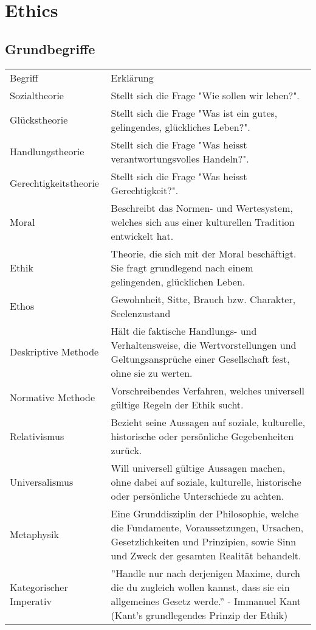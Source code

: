 \section{Ethics}
	\subsection{Grundbegriffe}
	
		\begin{longtable}{|p{}||p{}|}
			\hline
			Begriff
				& Erklärung\\
			\hhline{|=#=|}
			Sozialtheorie
				& Stellt sich die Frage "Wie sollen wir leben?".\\
			\hline
			Glückstheorie
				& Stellt sich die Frage "Was ist ein gutes, gelingendes, glückliches Leben?".\\
			\hline
			Handlungstheorie
				& Stellt sich die Frage "Was heisst verantwortungsvolles Handeln?".\\
			\hline
			Gerechtigkeitstheorie
				& Stellt sich die Frage "Was heisst Gerechtigkeit?".\\
			\hline
			Moral
				& Beschreibt das Normen- und Wertesystem, welches sich aus einer kulturellen Tradition entwickelt hat.\\
			\hline
			Ethik
				& Theorie, die sich mit der Moral beschäftigt. Sie fragt grundlegend nach einem gelingenden, glücklichen Leben.\\
			\hline
			Ethos
				& Gewohnheit, Sitte, Brauch bzw. Charakter, Seelenzustand\\
			\hline
			Deskriptive Methode
				& Hält die faktische Handlungs- und Verhaltensweise, die Wertvorstellungen und Geltungsansprüche einer Gesellschaft fest, ohne sie zu werten.\\
			\hline
			Normative Methode
				& Vorschreibendes Verfahren, welches universell gültige Regeln der Ethik sucht.\\
			\hline
			Relativismus
				& Bezieht seine Aussagen auf soziale, kulturelle, historische oder persönliche Gegebenheiten zurück.\\
			\hline
			Universalismus
				& Will universell gültige Aussagen machen, ohne dabei auf soziale, kulturelle, historische oder persönliche Unterschiede zu achten.\\
			\hline
			Metaphysik
				& Eine Grunddisziplin der Philosophie, welche die Fundamente, Voraussetzungen, Ursachen, Gesetzlichkeiten und Prinzipien, sowie Sinn und Zweck der gesamten Realität behandelt.\\
			\hline
			Kategorischer Imperativ
				& ''Handle nur nach derjenigen Maxime, durch die du zugleich wollen kannst, dass sie ein allgemeines Gesetz werde.'' - Immanuel Kant (Kant's grundlegendes Prinzip der Ethik)\\
			\hline
		\end{longtable}
		
